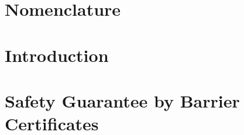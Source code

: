
\graphicspath{{figures/}}


	






\setcounter{page}{1}
\renewcommand{\thepage}{\Roman{page}}




\setlength\parskip{0ex}
\tableofcontents
\setlength\parskip{1ex}

\chapter*{Nomenclature}\label{chap:acronym}

\vspace{-0.35cm}

\printglossary[type=\acronymtype,style=glossary2col] %



\printglossary[type=symbols,style=altlong4col] %



\cleardoublepage
\setcounter{page}{1}
\renewcommand{\thepage}{\arabic{page}}

\chapter{Introduction}\label{chap:intro}



\chapter{Safety Guarantee by Barrier Certificates}\label{chap:barrier_cerificates}
	

